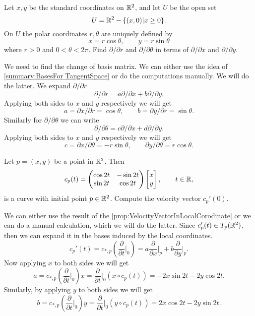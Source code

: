 \begin{problem}
	Let $ x,y $ be the standard coordinates on $ \mathbb{R}^2 $, and let $ U $ be the open set
	\[ U = \mathbb{R}^2 - \{(x,0)| x\geq 0\}.\]
	On $ U $ the polar coordinates $ r,\theta $ are uniquely defined by
	\[ x = r\cos\theta, \qquad y = r\sin\theta \]
	where $ r>0 $ and $ 0<\theta<2\pi $.
	Find $ \partial/\partial r $ and $ \partial/\partial \theta $ in terms of $ \partial/\partial x $ and $ \partial/\partial y $.
\end{problem}
\begin{solution}
	We need to find the change of basis matrix. We can either use the idea of \autoref{summary:BasesFor TangentSpace} or do the computations manually. We will do the latter. We expand $ \partial/\partial r $
	\[ \partial/\partial r = a \partial/\partial x + b \partial/\partial y. \]
	Applying both sides to $ x $ and $ y $ respectively we will get
	\[ a = \partial x/\partial r = \cos\theta,  \qquad b = \partial y/\partial r = \sin\theta. \]
	Similarly for $ \partial/\partial \theta $ we can write
	\[ \partial/\partial \theta = c \partial/\partial x + d \partial/\partial y. \]
	Applying both sides to $ x $ and $ y $ respectively we will get
	\[ c = \partial x/\partial \theta = -r\sin\theta, \qquad \partial y/\partial \theta =r\cos\theta. \]
\end{solution}

\begin{problem}
	Let $ p = (x,y) $ be a point in $ \mathbb{R}^2 $. Then 
	\[ c_p(t) = \begin{pmatrix} \cos 2t & -\sin 2t \\ \sin 2t & \cos 2t \end{pmatrix}\begin{bmatrix} x \\ y \end{bmatrix}, \qquad t \in \mathbb{R},\]
	is a curve with initial point $ p \in \mathbb{R}^2 $. Compute the velocity vector $ c_p'(0) $.
\end{problem}
\begin{solution}
	We can either use the result of the \autoref{prop:VelocityVectorInLocalCorodinate} or we can do a manual calculation, which we will do the latter. Since $ c_p'(t) \in T_p(\mathbb{R}^2) $, then we can expand it in the bases induced by the local coordinates. 
	\[ c_p'(t) = c_{*,p}(\frac{\partial}{\partial  t }\big|_{0})  = a \frac{\partial}{\partial  x}\big|_{p} + b \frac{\partial}{\partial  y }\big|_{p}.\]
	Now applying $ x $ to both sides we will get
	\[ a = c_{*,p}(\frac{\partial}{\partial  t }\big|_{0})x = \frac{\partial}{\partial  t }\big|_{0} (x\circ c_p(t)) = -2 x\sin 2t  - 2y\cos 2t.  \]
	Similarly, by applying $ y $ to both sides we will get
	\[ b = c_{*,p} (\frac{\partial}{\partial  t }\big|_{0}) y = \frac{\partial}{\partial  t }\big|_{0} (y\circ c_p(t)) = 2x\cos 2t - 2y\sin 2t.\]
\end{solution}


